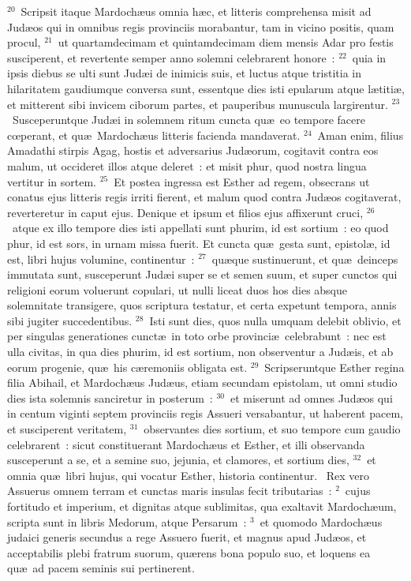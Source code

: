 ${}^{20}$~Scripsit itaque Mardoch\ae us omnia h\ae c, et litteris comprehensa misit ad Jud\ae os qui in omnibus regis provinciis morabantur, tam in vicino positis, quam procul,
${}^{21}$~ut quartamdecimam et quintamdecimam diem mensis Adar pro festis susciperent, et revertente semper anno solemni celebrarent honore~:
${}^{22}$~quia in ipsis diebus se ulti sunt Jud\ae i de inimicis suis, et luctus atque tristitia in hilaritatem gaudiumque conversa sunt, essentque dies isti epularum atque l\ae titi\ae , et mitterent sibi invicem ciborum partes, et pauperibus munuscula largirentur.
${}^{23}$~Susceperuntque Jud\ae i in solemnem ritum cuncta qu\ae\ eo tempore facere cœperant, et qu\ae\ Mardoch\ae us litteris facienda mandaverat.
${}^{24}$~Aman enim, filius Amadathi stirpis Agag, hostis et adversarius Jud\ae orum, cogitavit contra eos malum, ut occideret illos atque deleret~: et misit phur, quod nostra lingua vertitur in sortem.
${}^{25}$~Et postea ingressa est Esther ad regem, obsecrans ut conatus ejus litteris regis irriti fierent, et malum quod contra Jud\ae os cogitaverat, reverteretur in caput ejus. Denique et ipsum et filios ejus affixerunt cruci,
${}^{26}$~atque ex illo tempore dies isti appellati sunt phurim, id est sortium~: eo quod phur, id est sors, in urnam missa fuerit. Et cuncta qu\ae\ gesta sunt, epistol\ae , id est, libri hujus volumine, continentur~:
${}^{27}$~qu\ae que sustinuerunt, et qu\ae\ deinceps immutata sunt, susceperunt Jud\ae i super se et semen suum, et super cunctos qui religioni eorum voluerunt copulari, ut nulli liceat duos hos dies absque solemnitate transigere, quos scriptura testatur, et certa expetunt tempora, annis sibi jugiter succedentibus.
${}^{28}$~Isti sunt dies, quos nulla umquam delebit oblivio, et per singulas generationes cunct\ae\ in toto orbe provinci\ae\ celebrabunt~: nec est ulla civitas, in qua dies phurim, id est sortium, non observentur a Jud\ae is, et ab eorum progenie, qu\ae\ his c\ae remoniis obligata est.
${}^{29}$~Scripseruntque Esther regina filia Abihail, et Mardoch\ae us Jud\ae us, etiam secundam epistolam, ut omni studio dies ista solemnis sanciretur in posterum~:
${}^{30}$~et miserunt ad omnes Jud\ae os qui in centum viginti septem provinciis regis Assueri versabantur, ut haberent pacem, et susciperent veritatem,
${}^{31}$~observantes dies sortium, et suo tempore cum gaudio celebrarent~: sicut constituerant Mardoch\ae us et Esther, et illi observanda susceperunt a se, et a semine suo, jejunia, et clamores, et sortium dies,
${}^{32}$~et omnia qu\ae\ libri hujus, qui vocatur Esther, historia continentur.
~Rex vero Assuerus omnem terram et cunctas maris insulas fecit tributarias~:
${}^{2}$~cujus fortitudo et imperium, et dignitas atque sublimitas, qua exaltavit Mardoch\ae um, scripta sunt in libris Medorum, atque Persarum~:
${}^{3}$~et quomodo Mardoch\ae us judaici generis secundus a rege Assuero fuerit, et magnus apud Jud\ae os, et acceptabilis plebi fratrum suorum, qu\ae rens bona populo suo, et loquens ea qu\ae\ ad pacem seminis sui pertinerent.



